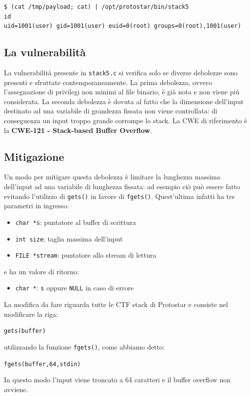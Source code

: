 \begin{mdframed}[backgroundcolor=white!20,shadow=false]
\begin{lstlisting}
$ (cat /tmp/payload; cat) | /opt/protostar/bin/stack5
id
uid=1001(user) gid=1001(user) euid=0(root) groups=0(root),1001(user)
\end{lstlisting}
\end{mdframed}

\subsection{La vulnerabilità}
La vulnerabilità presente in \texttt{stack5.c} si verifica solo se diverse debolezze sono presenti e sfruttate contemporaneamente. La prima debolezza, ovvero l'assegnazione di privilegi non minimi al file binario, è già nota e non viene più considerata. La seconda debolezza è dovuta al fatto che la dimensione dell'input destinato ad una variabile di grandezza fissata non viene controllata: di conseguenza un input troppo grande corrompe lo stack. La CWE di riferimento è la \textbf{CWE-121 - Stack-based Buffer Overflow}.

\subsection{Mitigazione}
Un modo per mitigare questa debolezza è limitare la lunghezza massima dell'input ad una variabile di lunghezza fissata: ad esempio ciò può essere fatto evitando l'utilizzo di \texttt{gets()} in favore di \texttt{fgets()}. Quest'ultima infatti ha tre parametri in ingresso:
\begin{itemize}
    \item \texttt{char *s}: puntatore al buffer di scrittura
    \item \texttt{int size}: taglia massima dell'input
    \item \texttt{FILE *stream}: puntatore allo stream di lettura
\end{itemize}
e ha un valore di ritorno:
\begin{itemize}
    \item \texttt{char *}: \texttt{s} oppure \texttt{NULL} in caso di errore
\end{itemize}
La modifica da fare riguarda tutte le CTF stack di Protostar e consiste nel modificare la riga:
\begin{center}
    \texttt{gets(buffer)}
\end{center}
utilizzando la funzione \texttt{fgets()}, come abbiamo detto:
\begin{center}
    \texttt{fgets(buffer,64,stdin)}
\end{center}
In questo modo l'input viene troncato a 64 caratteri e il buffer overflow non avviene.


\let\cleardoublepage\clearpage


